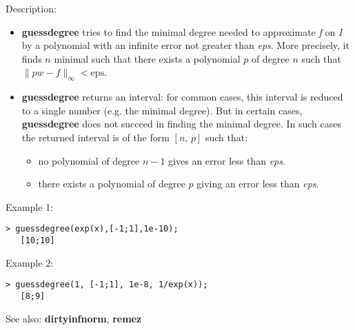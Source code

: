 \noindent Description: \begin{itemize}

\item \textbf{guessdegree} tries to find the minimal degree needed to approximate \emph{f}
   on \emph{I} by a polynomial with an infinite error not greater than \emph{eps}.
   More precisely, it finds $n$ minimal such that there exists a
   polynomial $p$ of degree $n$ such that $\|pw-f\|_{\infty} < \mathrm{eps}$.

\item \textbf{guessdegree} returns an interval: for common cases, this interval is reduced to a 
   single number (e.g. the minimal degree). But in certain cases, \textbf{guessdegree} does
   not succeed in finding the minimal degree. In such cases the returned interval
   is of the form $[n,\,p]$ such that:
   \begin{itemize}
   \item no polynomial of degree $n-1$ gives an error less than \emph{eps}.
   \item there exists a polynomial of degree $p$ giving an error less than \emph{eps}. 
   \end{itemize}
\end{itemize}
\noindent Example 1: 
\begin{center}\begin{minipage}{14.8cm}\begin{Verbatim}[frame=single]
   > guessdegree(exp(x),[-1;1],1e-10);
   [10;10]
\end{Verbatim}
\end{minipage}\end{center}
\noindent Example 2: 
\begin{center}\begin{minipage}{14.8cm}\begin{Verbatim}[frame=single]
   > guessdegree(1, [-1;1], 1e-8, 1/exp(x));
   [8;9]
\end{Verbatim}
\end{minipage}\end{center}
See also: \textbf{dirtyinfnorm}, \textbf{remez}
